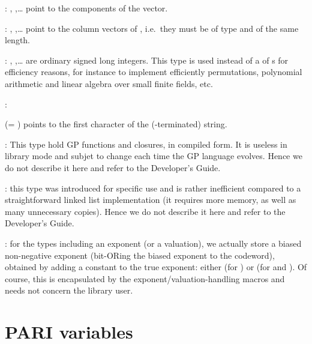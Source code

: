 :%
, ,\dots {} point to the components of the
vector.

: ,
,\dots {} point to the column vectors of ,
i.e.~they must be of type  and of the same length.

:
, ,\dots {} are ordinary signed long
integers. This type is used instead of a  of s for
efficiency reasons, for instance to implement efficiently permutations,
polynomial arithmetic and linear algebra over small finite fields, etc.

:%

 (= ) points to the first character of the
(-terminated) string.

:
This type hold GP functions and closures, in compiled form. It is useless in
library mode and subjet to change each time the GP language evolves. Hence we
do not describe it here and refer to the Developer's Guide.

:
this type was introduced for specific  use and is rather inefficient
compared to a straightforward linked list implementation (it requires more
memory, as well as many unnecessary copies). Hence we do not describe it
here and refer to the Developer's Guide.

: for the types including an exponent (or a
valuation), we actually store a biased non-negative exponent (bit-ORing the
biased exponent to the codeword), obtained by adding a constant to the true
exponent: either  (for ) or  (for
 and ). Of course, this is encapsulated by the
exponent/valuation-handling macros and needs not concern the library user.

\section{PARI variables}\label{se:vars} 

